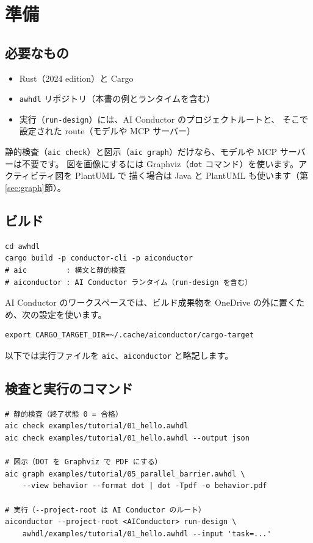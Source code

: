 \documentclass[a4paper,11pt]{ltjsarticle}
\begin{document}
\section{準備}

\subsection{必要なもの}

\begin{itemize}
  \item Rust（2024 edition）と Cargo
  \item \texttt{awhdl} リポジトリ（本書の例とランタイムを含む）
  \item 実行（\texttt{run-design}）には、AI Conductor のプロジェクトルートと、
        そこで設定された route（モデルや MCP サーバー）
\end{itemize}

静的検査（\texttt{aic check}）と図示（\texttt{aic graph}）だけなら、モデルや MCP サーバーは不要です。
図を画像にするには Graphviz（\texttt{dot} コマンド）を使います。アクティビティ図を PlantUML で
描く場合は Java と PlantUML も使います（第\ref{sec:graph}節）。

\subsection{ビルド}

\begin{lstlisting}[style=shell]
cd awhdl
cargo build -p conductor-cli -p aiconductor
# aic         : 構文と静的検査
# aiconductor : AI Conductor ランタイム（run-design を含む）
\end{lstlisting}

AI Conductor のワークスペースでは、ビルド成果物を OneDrive の外に置くため、次の設定を使います。

\begin{lstlisting}[style=shell]
export CARGO_TARGET_DIR=~/.cache/aiconductor/cargo-target
\end{lstlisting}

以下では実行ファイルを \texttt{aic}、\texttt{aiconductor} と略記します。

\subsection{検査と実行のコマンド}

\begin{lstlisting}[style=shell]
# 静的検査（終了状態 0 = 合格）
aic check examples/tutorial/01_hello.awhdl
aic check examples/tutorial/01_hello.awhdl --output json

# 図示（DOT を Graphviz で PDF にする）
aic graph examples/tutorial/05_parallel_barrier.awhdl \
    --view behavior --format dot | dot -Tpdf -o behavior.pdf

# 実行（--project-root は AI Conductor のルート）
aiconductor --project-root <AIConductor> run-design \
    awhdl/examples/tutorial/01_hello.awhdl --input 'task=...'
\end{lstlisting}
\end{document}
